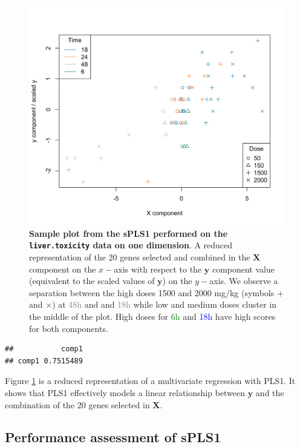 \documentclass[]{book}
\newenvironment{Shaded}{\begin{snugshade}}{\end{snugshade}}
\newcommand{\KeywordTok}[1]{\textcolor[rgb]{0.13,0.29,0.53}{\textbf{#1}}}
\newcommand{\NormalTok}[1]{#1}
\newcommand{\OperatorTok}[1]{\textcolor[rgb]{0.81,0.36,0.00}{\textbf{#1}}}
\begin{document}
\begin{figure}

{\centering \includegraphics[width=0.5\linewidth]{Figures/PLS/spls1-comp1-1} 

}

\caption{\textbf{Sample plot from the sPLS1 performed on the \texttt{liver.toxicity} data on one dimension}. A reduced representation of the 20 genes selected and combined in the \(\boldsymbol X\) component on the \(x-\)axis with respect to the \(\boldsymbol y\) component value (equivalent to the scaled values of \(\boldsymbol y\)) on the \(y-\)axis. We observe a separation between the high doses 1500 and 2000 mg/kg (symbols \(+\) and \(\times\)) at \textcolor{grey}{48h} and and \textcolor{grey}{18h} while low and medium doses cluster in the middle of the plot. High doses for \textcolor{green}{6h} and \textcolor{blue}{18h} have high scores for both components.}\label{fig:spls1-comp1}
\end{figure}

\begin{Shaded}
\end{Shaded}

\begin{verbatim}
##           comp1
## comp1 0.7515489
\end{verbatim}



Figure \ref{fig:spls1-comp1} is a reduced representation of a multivariate regression with PLS1. It shows that PLS1 effectively models a linear relationship between \(\boldsymbol y\) and the combination of the 20 genes selected in \(\boldsymbol X\).

\hypertarget{pls1:perf}{%
\subsection{Performance assessment of sPLS1}\label{pls1:perf}}
\end{document}
